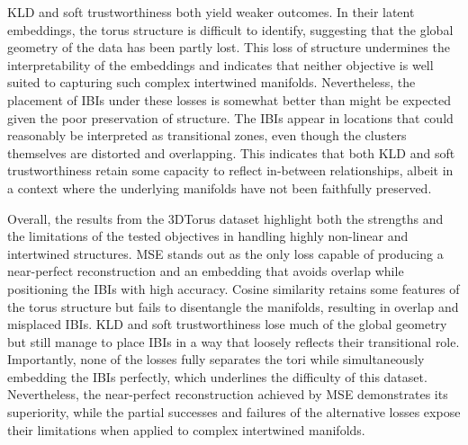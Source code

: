 KLD and soft trustworthiness both yield weaker outcomes. In their latent embeddings, the torus structure is difficult to identify, suggesting that the global geometry of the data has been partly lost. This loss of structure undermines the interpretability of the embeddings and indicates that neither objective is well suited to capturing such complex intertwined manifolds. Nevertheless, the placement of IBIs under these losses is somewhat better than might be expected given the poor preservation of structure. The IBIs appear in locations that could reasonably be interpreted as transitional zones, even though the clusters themselves are distorted and overlapping. This indicates that both KLD and soft trustworthiness retain some capacity to reflect in-between relationships, albeit in a context where the underlying manifolds have not been faithfully preserved.

Overall, the results from the 3DTorus dataset highlight both the strengths and the limitations of the tested objectives in handling highly non-linear and intertwined structures. MSE stands out as the only loss capable of producing a near-perfect reconstruction and an embedding that avoids overlap while positioning the IBIs with high accuracy. Cosine similarity retains some features of the torus structure but fails to disentangle the manifolds, resulting in overlap and misplaced IBIs. KLD and soft trustworthiness lose much of the global geometry but still manage to place IBIs in a way that loosely reflects their transitional role. Importantly, none of the losses fully separates the tori while simultaneously embedding the IBIs perfectly, which underlines the difficulty of this dataset. Nevertheless, the near-perfect reconstruction achieved by MSE demonstrates its superiority, while the partial successes and failures of the alternative losses expose their limitations when applied to complex intertwined manifolds.

